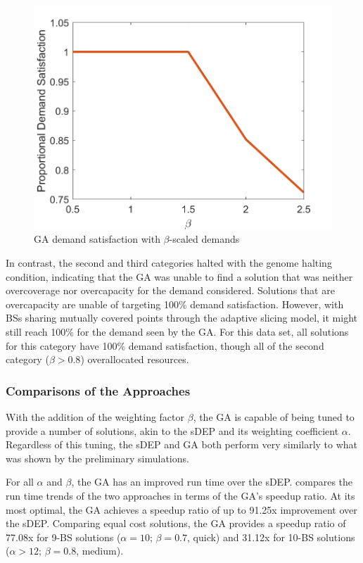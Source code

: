 \documentclass[12pt,dvipsnames]{report}
\begin{document}
\begin{figure}[htp]
	\centering
	\includegraphics[height=0.4\textheight]{Figures/CaseI_GAScaledSatisfaction}
	\caption[GA demand satisfaction with $\beta$-scaled demands for Case I simulations]{GA demand satisfaction with $\beta$-scaled demands}
	\label{fig:CaseI_GAScaledSatisfaction}
\end{figure}

In contrast, the second and third categories halted with the genome halting condition, indicating that the GA was unable to find a solution that was neither overcoverage nor overcapacity for the demand considered.  Solutions that are overcapacity are unable of targeting 100\% demand satisfaction.  However, with BSs sharing mutually covered points through the adaptive slicing model, it might still reach 100\% for the demand seen by the GA.  For this data set, all solutions for this category have 100\% demand satisfaction, though all of the second category ($\beta > 0.8$) overallocated resources.

\subsubsection{Comparisons of the Approaches}

With the addition of the weighting factor $\beta$, the GA is capable of being tuned to provide a number of solutions, akin to the sDEP and its weighting coefficient $\alpha$.  Regardless of this tuning, the sDEP and GA both perform very similarly to what was shown by the preliminary simulations.

For all $\alpha$ and $\beta$, the GA has an improved run time over the sDEP.   compares the run time trends of the two approaches in terms of the GA's speedup ratio.  At its most optimal, the GA achieves a speedup ratio of up to 91.25x improvement over the sDEP.  Comparing equal cost solutions, the GA provides a speedup ratio of 77.08x for 9-BS solutions ($\alpha = 10;\, \beta = 0.7$, quick) and 31.12x for 10-BS solutions ($\alpha > 12;\, \beta = 0.8$, medium).
\end{document}
